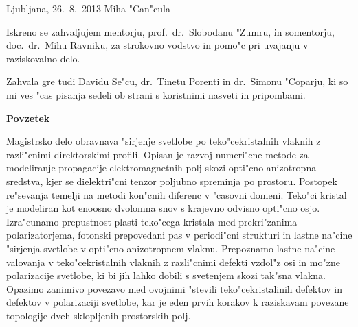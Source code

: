 \documentclass[12pt,twoside,openright,final,a4paper]{report}
\begin{document}
\bigskip
\bigskip

\noindent
Ljubljana, 26.~8.~2013 \hfill Miha "Can"cula

\vfill

\newpage

\thispagestyle{empty}
\quad

\newpage


\normalsize
\thispagestyle{empty}
\centerline{}
\vfill

\vfill

\vfill

\vfill


\par{\narrower\narrower\narrower\parindent 0pt

Iskreno se zahvaljujem mentorju, prof.~dr.~Slobodanu "Zumru, in somentorju, doc.~dr.~Mihu Ravniku, za strokovno vodstvo in pomo"c pri uvajanju v raziskovalno delo.

\quad

Zahvala gre tudi Davidu Se"cu, dr.~Tinetu Porenti in dr.~Simonu "Coparju, ki so mi ves "cas pisanja sedeli ob strani s koristnimi nasveti in pripombami. 

\par}

\vfill




\newpage

\thispagestyle{empty}
\quad

\newpage


\normalsize
\thispagestyle{empty}

\vfill
\centerline{\bf Povzetek}
\bigskip
\noindent

Magistrsko delo obravnava "sirjenje svetlobe po teko"cekristalnih vlaknih z razli"cnimi direktorskimi profili. 
Opisan je razvoj numeri"cne metode za modeliranje propagacije elektromagnetnih polj skozi opti"cno anizotropna sredstva, kjer se dielektri"cni tenzor poljubno spreminja po prostoru. 
Postopek re"sevanja temelji na metodi kon"cnih diferenc v "casovni domeni. 
Teko"ci kristal je modeliran kot enoosno dvolomna snov s krajevno odvisno opti"cno osjo.
Izra"cunamo prepustnost plasti teko"cega kristala med prekri"zanima polarizatorjema, fotonski prepovedani pas v periodi"cni strukturi in lastne na"cine "sirjenja svetlobe v opti"cno anizotropnem vlaknu. 
Prepoznamo lastne na"cine valovanja v teko"cekristalnih vlaknih z razli"cnimi defekti vzdol"z osi in mo"zne polarizacije svetlobe, ki bi jih lahko dobili s svetenjem skozi tak"sna vlakna. 
Opazimo zanimivo povezavo med ovojnimi "stevili teko"cekristalinih defektov in defektov v polarizaciji svetlobe, kar je eden prvih korakov k raziskavam povezane topologije dveh sklopljenih prostorskih polj. 
\end{document}
